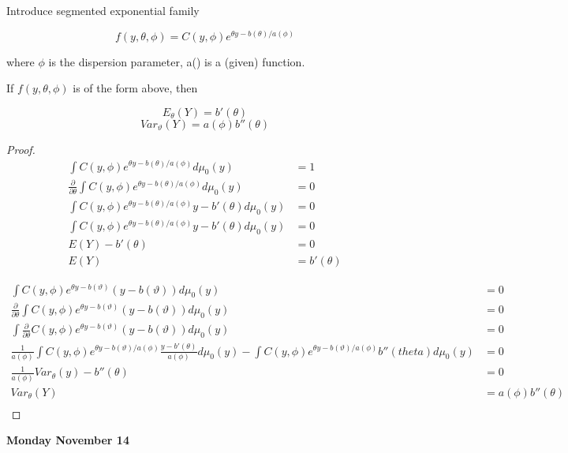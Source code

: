 \documentclass[11pt,fleqn]{book} %
\begin{document}
Introduce segmented exponential family
	
	$$f(y, \theta, \phi) = C(y, \phi) e^{\theta y - b(\theta)/ a(\phi)} $$	

where $\phi$ is the dispersion parameter, a() is a (given) function. 

\begin{theorem}
	If $f(y, \theta, \phi)$ is of the form above, then 

			$$E_\theta(Y) = b'(\theta) $$
			$$Var_\vartheta(Y) = a(\phi) b''(\theta) $$
\end{theorem}

\begin{proof}
	
			\begin{align*}
				\int C(y, \phi) e^{\theta y - b(\theta)/ a(\phi)} d\mu_0(y) &= 1\\
				\frac{\partial}{\partial \theta}\int C(y, \phi) e^{\theta y - b(\theta)/ a(\phi)} d\mu_0(y) &= 0\\
				\int C(y, \phi) e^{\theta y - b(\theta)/ a(\phi)} y - b'(\theta)  d\mu_0(y) &= 0\\
				\int C(y, \phi) e^{\theta y - b(\theta)/ a(\phi)} y - b'(\theta)  d\mu_0(y) &= 0\\
				E(Y) - b'(\theta) &= 0\\
				E(Y) &= b'(\theta)
			\end{align*} 


			\begin{align*}
			\int C(y, \phi) e^{\theta y - b(\vartheta)} (y - b(\vartheta)) d \mu_0(y) &= 0\\
			\frac{\partial}{\partial \theta}\int C(y, \phi) e^{\theta y - b(\vartheta)} (y - b(\vartheta)) d \mu_0(y) &= 0\\
			\int \frac{\partial}{\partial \theta} C(y, \phi) e^{\theta y - b(\vartheta)} (y - b(\vartheta)) d \mu_0(y) &= 0\\
			\frac{1}{a(\phi)} \int C(y, \phi)e^{\theta y - b(\vartheta)/ a(\phi)} \frac{y - b'(\theta)}{a(\phi)}d\mu_0(y) - \int C(y, \phi)e^{\theta y - b(\vartheta)/ a(\phi)} b''(theta) d\mu_0(y) &= 0\\
			\frac{1}{a(\phi)} Var_\theta(y) - b''(\theta) &= 0\\
			Var_\theta(Y) &= a(\phi)b''(\theta)\\
			\end{align*}
\end{proof}

\textbf{Monday November 14}\\
\end{document}
